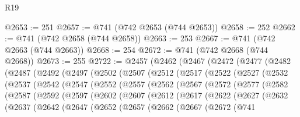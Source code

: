 \begin{lexlean}{R19}
\begin{coremodule}
@2653 := 251
@2657 := @741 (@742 @2653 (@744 @2653))
@2658 := 252
@2662 := @741 (@742 @2658 (@744 @2658))
@2663 := 253
@2667 := @741 (@742 @2663 (@744 @2663))
@2668 := 254
@2672 := @741 (@742 @2668 (@744 @2668))
@2673 := 255
@2722 := @2457
    (@2462
      (@2467
        (@2472
          (@2477
            (@2482
              (@2487
                (@2492
                  (@2497
                    (@2502
                      (@2507
                        (@2512
                          (@2517
                            (@2522
                              (@2527
                                (@2532
                                  (@2537
                                    (@2542
                                      (@2547
                                        (@2552
                                          (@2557
                                            (@2562
                                              (@2567
                                                (@2572
                                                  (@2577
                                                    (@2582
                                                      (@2587
                                                        (@2592
                                                          (@2597
                                                            (@2602
                                                              (@2607
                                                                (@2612
                                                                  (@2617
                                                                    (@2622
                                                                      (@2627
                                                                        (@2632
                                                                          (@2637
                                                                            (@2642
                                                                              (@2647
                                                                                (@2652
                                                                                  (@2657
                                                                                    (@2662
                                                                                      (@2667
                                                                                        (@2672
                                                                                          (@741

\end{coremodule}
\end{lexlean}
